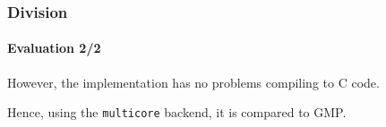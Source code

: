 \begin{frame}[fragile]
  \frametitle{Division}
  \framesubtitle{Evaluation 2/2}
  However, the implementation has no problems compiling to C code.

  Hence, using the \texttt{multicore} backend, it is compared to GMP\cite{GMP}.\pause
  
\end{frame}

